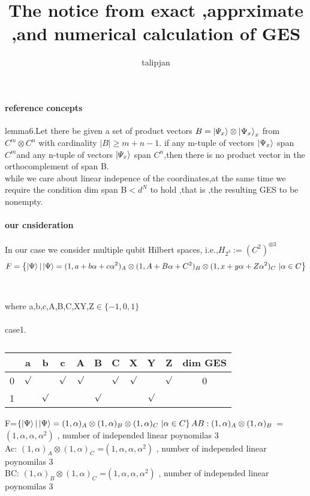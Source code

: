 \documentclass[12pt,twoside]{report}
\title{The  notice from exact ,apprximate ,and numerical calculation of GES}
\author{talipjan}
\begin{document}
	
			
	\paragraph{reference concepts}
	lemma6.Let there be given  a  set of product vectors $B={\ket{\varPsi _{x}}  \otimes \ket{\Psi_{x}} }_{x}$ from $ C^{m}\otimes C^{n} $ with cardinality $ |B|\geq m+n-1. $ if any m-tuple of vectors $ \ket{\Psi_{x}} $ span $ C^{m} $and  any n-tuple of vectors $ \ket{\varPsi_{x}} $ span $ C^{n} $,then there is no product vector in the orthocomplement of span B.	
	\newline\\
	while we care about linear indepence of the coordinates,at the same time we require the condition dim span B$ < d^{N} $ to hold ,that is ,the resulting GES to be nonempty.
\paragraph{our cnsideration}
   In our case we consider multiple qubit Hilbert spaces, i.e.,$ H_{2^{3}} :=(C^{2})^{\otimes3}$
   \\
   \begin{equation*}
F= \left\lbrace {\Ket{\Psi}|\ket{\Psi}=(1,a+b\alpha+c\alpha^{2})_{A}\otimes(1,A+B\alpha+C^{2})_{B}\otimes(1,x+y\alpha+Z\alpha^{2})_{C}}  \ |\alpha\in C\right\rbrace 
   \end{equation*}
   \\   
   \\
    where a,b,c,A,B,C,XY,Z$ \in \{-1,0,1\} $
   \\
   \\
   case1.
  \\
 \begin{table}[ht]
 	\centering
 	\begin{tabular}{|c|c|c|c|c|c|c|c|c|c|c|}
 		\hline
 		 & a & b  &  c & A & B & C & X & Y & Z & dim GES  \\
 		\hline
 		0	& $\surd$&  &$\surd$ &$\surd$ & &$\surd$ &$\surd$ & &  $\surd$& 0\\
 		\hline
 		 	1 &	&$\surd$ & & &$\surd$ & & &$\surd$ &  &\\
 		\hline 		
 	\end{tabular}
 	\caption{}
\end{table}
 
   F=$ \left\lbrace {\Ket{\Psi}|\ket{\Psi}=(1,\alpha)_{A}\otimes(1,\alpha)_{B}\otimes(1,\alpha)_{C}}  \ |\alpha\in C\right\rbrace  
  \\
  AB:  (1,\alpha)_{A} \otimes(1,\alpha)_{B}$ =$ (1,\alpha,\alpha,\alpha^{2})$  ,  number of independed linear poynomilas  3  \\
  Ac:  $(1,\alpha)_{A} \otimes(1,\alpha)_{C}$ =$ (1,\alpha,\alpha,\alpha^{2})$  ,  number of independed linear poynomilas  3  \\
  BC:  $(1,\alpha)_{B} \otimes(1,\alpha)_{C}$ =$ (1,\alpha,\alpha,\alpha^{2})$  ,  number of independed linear poynomilas  3  \\
  
\end{document}
